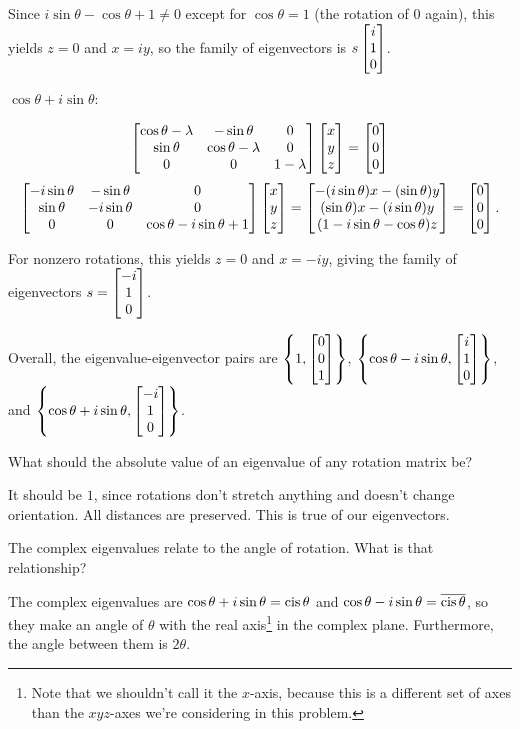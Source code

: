 \documentclass[../gatm_answers.tex]{subfiles}
\begin{document}
Since $i\sin\theta - \cos\theta + 1 \neq 0$ except for $\cos\theta=1$ (the rotation of $0$ again), this yields $z=0$ and $x=iy$, so the family of eigenvectors is $s\begin{bmatrix} i \\ 1 \\ 0 \end{bmatrix}$.

$\cos\theta + i\sin\theta$:

$$\begin{bmatrix} \cos\theta - \lambda & -\sin\theta & 0 \\ \sin\theta & \cos\theta- \lambda & 0 \\ 0 & 0 & 1- \lambda \end{bmatrix}\begin{bmatrix} x \\ y \\ z \end{bmatrix} = \begin{bmatrix} 0 \\ 0 \\ 0 \end{bmatrix}$$
$$\begin{bmatrix} -i\sin\theta & -\sin\theta & 0 \\ \sin\theta & -i\sin\theta & 0 \\ 0 & 0 &  \cos\theta - i\sin\theta + 1 \end{bmatrix}\begin{bmatrix} x \\ y \\ z \end{bmatrix}=\begin{bmatrix} -(i\sin\theta)x-(\sin\theta)y \\ (\sin\theta)x-(i\sin\theta)y \\ (1-i\sin\theta-\cos\theta)z \end{bmatrix} =\begin{bmatrix} 0 \\ 0 \\ 0 \end{bmatrix}.$$

For nonzero rotations, this yields $z=0$ and $x=-iy$, giving the family of eigenvectors $s=\begin{bmatrix} -i \\ 1 \\ 0 \end{bmatrix}$.

Overall, the eigenvalue-eigenvector pairs are $\left\{1, \begin{bmatrix} 0 \\ 0 \\ 1 \end{bmatrix}\right\}$, $\left\{\cos\theta - i\sin\theta, \begin{bmatrix} i \\ 1 \\ 0 \end{bmatrix}\right\}$, and $\left\{\cos\theta + i\sin\theta, \begin{bmatrix} -i \\ 1 \\ 0 \end{bmatrix}\right\}$.

\begin{outer_problem}
\item
\end{outer_problem}

\begin{inner_problem}
\item What should the absolute value of an eigenvalue of any rotation matrix be?
\end{inner_problem}

It should be $1$, since rotations don't stretch anything and doesn't change orientation. All distances are preserved. This is true of our eigenvectors.

\begin{inner_problem}
\item The complex eigenvalues relate to the angle of rotation. What is that relationship?
\end{inner_problem}

The complex eigenvalues are $\cos\theta + i\sin\theta=\operatorname{cis}\theta$ and $\cos\theta - i\sin\theta=\overline{\operatorname{cis}\theta}$, so they make an angle of $\theta$ with the real axis\footnote{Note that we shouldn't call it the $x$-axis, because this is a different set of axes than the $xyz$-axes we're considering in this problem.} in the complex plane. Furthermore, the angle between them is $2\theta$.
\end{document}
